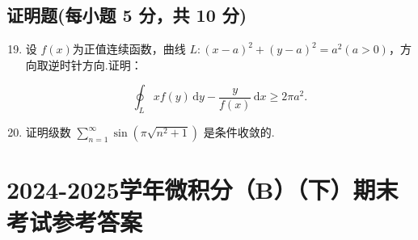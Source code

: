 \documentclass[../Main.tex]{subfiles}
\begin{document}
\section{证明题(每小题 5 分，共 10 分)}
\begin{enumerate}
  \setcounter{enumi}{18}
  \item 设 \(f(x) \)为正值连续函数，曲线 \( L:(x-a)^2+(y-a)^2=a^2(a>0) \)，方向取逆时针方向.证明：

        \[\displaystyle \oint_L xf(y)\,\mathrm{d}y-\dfrac{y}{f(x)}\,\mathrm{d}x \geq 2\pi a^2.\]
        \vspace{10em}

  \item 证明级数 \( \displaystyle \sum \limits_{n=1}^{\infty} \sin\left({\pi \sqrt{n^2+1}}\right) \) 是条件收敛的.
        \vspace{10em}
\end{enumerate}
\chapter{2024-2025学年微积分（B）（下）期末考试参考答案}
\end{document}
